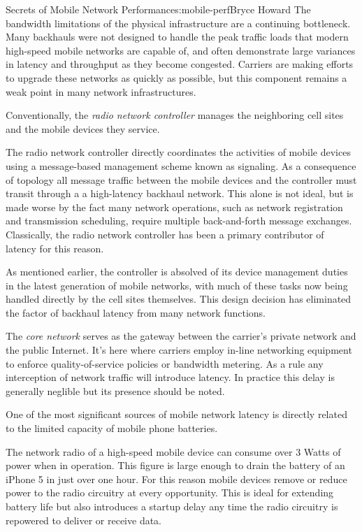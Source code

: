 \begin{aosachapter}{Secrets of Mobile Network Performance}{s:mobile-perf}{Bryce Howard}
The bandwidth limitations of the physical infrastructure are a
continuing bottleneck. Many backhauls were not designed to handle the
peak traffic loads that modern high-speed mobile networks are capable
of, and often demonstrate large variances in latency and throughput as
they become congested. Carriers are making efforts to upgrade these
networks as quickly as possible, but this component remains a weak point
in many network infrastructures.


Conventionally, the \emph{radio network controller} manages the
neighboring cell sites and the mobile devices they service.

The radio network controller directly coordinates the activities of
mobile devices using a message-based management scheme known as
signaling. As a consequence of topology all message traffic between the
mobile devices and the controller must transit through a a high-latency
backhaul network. This alone is not ideal, but is made worse by the fact
many network operations, such as network registration and transmission
scheduling, require multiple back-and-forth message exchanges.
Classically, the radio network controller has been a primary contributor
of latency for this reason.

As mentioned earlier, the controller is absolved of its device
management duties in the latest generation of mobile networks, with much
of these tasks now being handled directly by the cell sites themselves.
This design decision has eliminated the factor of backhaul latency from
many network functions.


The \emph{core network} serves as the gateway between the carrier's
private network and the public Internet. It's here where carriers employ
in-line networking equipment to enforce quality-of-service policies or
bandwidth metering. As a rule any interception of network traffic will
introduce latency. In practice this delay is generally neglible but its
presence should be noted.


One of the most significant sources of mobile network latency is
directly related to the limited capacity of mobile phone batteries.

The network radio of a high-speed mobile device can consume over 3 Watts
of power when in operation. This figure is large enough to drain the
battery of an iPhone 5 in just over one hour. For this reason mobile
devices remove or reduce power to the radio circuitry at every
opportunity. This is ideal for extending battery life but also
introduces a startup delay any time the radio circuitry is repowered to
deliver or receive data.


\end{aosachapter}
